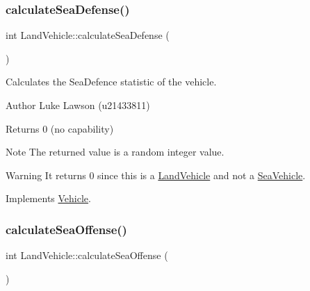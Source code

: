 \mbox{\label{class_land_vehicle_a5a07a90d8307b0ac44e2caacb84eb64e}} 
\subsubsection{\texorpdfstring{calculateSeaDefense()}{calculateSeaDefense()}}
{\footnotesize\ttfamily int Land\+Vehicle\+::calculate\+Sea\+Defense (\begin{DoxyParamCaption}{ }\end{DoxyParamCaption})\hspace{0.3cm}{\ttfamily [virtual]}}



Calculates the Sea\+Defence statistic of the vehicle. 

\begin{DoxyAuthor}{Author}
Luke Lawson (u21433811) 
\end{DoxyAuthor}
\begin{DoxyReturn}{Returns}
0 (no capability) 
\end{DoxyReturn}
\begin{DoxyNote}{Note}
The returned value is a random integer value. 
\end{DoxyNote}
\begin{DoxyWarning}{Warning}
It returns 0 since this is a \mbox{\hyperlink{class_land_vehicle}{Land\+Vehicle}} and not a \mbox{\hyperlink{class_sea_vehicle}{Sea\+Vehicle}}. 
\end{DoxyWarning}


Implements \mbox{\hyperlink{class_vehicle_a20e871b1ff13d47f4c875c987ed68add}{Vehicle}}.

\mbox{\label{class_land_vehicle_a679b1e2f608cdfad427449240a504999}} 
\subsubsection{\texorpdfstring{calculateSeaOffense()}{calculateSeaOffense()}}
{\footnotesize\ttfamily int Land\+Vehicle\+::calculate\+Sea\+Offense (\begin{DoxyParamCaption}{ }\end{DoxyParamCaption})\hspace{0.3cm}{\ttfamily [virtual]}}



